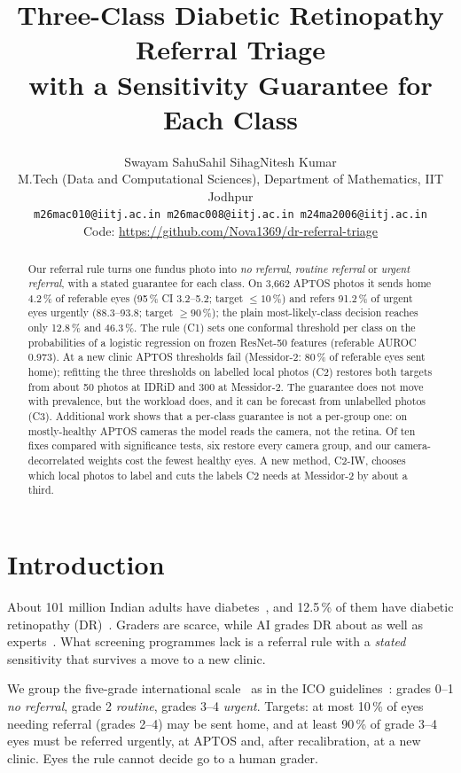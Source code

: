 \documentclass[10pt,twocolumn,letterpaper]{article}
\title{Three-Class Diabetic Retinopathy Referral Triage\\with a Sensitivity Guarantee for Each Class}
\author{Swayam Sahu\qquad Sahil Sihag\qquad Nitesh Kumar\\
M.Tech (Data and Computational Sciences), Department of Mathematics, IIT Jodhpur\\
{\tt\small m26mac010@iitj.ac.in \quad m26mac008@iitj.ac.in \quad m24ma2006@iitj.ac.in}\\
{\small Code: \url{https://github.com/Nova1369/dr-referral-triage}}}
\newcommand{\pct}{\,\%}
\begin{document}
\maketitle

\begin{abstract}
Our referral rule turns one fundus photo into \emph{no referral}, \emph{routine referral} or \emph{urgent referral}, with a stated guarantee for each class. On 3,662 APTOS photos it sends home 4.2\pct{} of referable eyes (95\pct{} CI 3.2--5.2; target ${\le}10$\pct) and refers 91.2\pct{} of urgent eyes urgently (88.3--93.8; target ${\ge}90$\pct); the plain most-likely-class decision reaches only 12.8\pct{} and 46.3\pct. The rule (C1) sets one conformal threshold per class on the probabilities of a logistic regression on frozen ResNet-50 features (referable AUROC 0.973). At a new clinic APTOS thresholds fail (Messidor-2: 80\pct{} of referable eyes sent home); refitting the three thresholds on labelled local photos (C2) restores both targets from about 50 photos at IDRiD and 300 at Messidor-2. The guarantee does not move with prevalence, but the workload does, and it can be forecast from unlabelled photos (C3). Additional work shows that a per-class guarantee is not a per-group one: on mostly-healthy APTOS cameras the model reads the camera, not the retina. Of ten fixes compared with significance tests, six restore every camera group, and our camera-decorrelated weights cost the fewest healthy eyes. A new method, C2-IW, chooses which local photos to label and cuts the labels C2 needs at Messidor-2 by about a third.
\end{abstract}

\section{Introduction}
About 101 million Indian adults have diabetes~\cite{indiab}, and 12.5\pct{} of them have diabetic retinopathy (DR)~\cite{smart}. Graders are scarce, while AI grades DR about as well as experts~\cite{gulshan16,gulshan19}. What screening programmes lack is a referral rule with a \emph{stated} sensitivity that survives a move to a new clinic.

We group the five-grade international scale~\cite{wilkinson} as in the ICO guidelines~\cite{ico}: grades 0--1 \emph{no referral}, grade 2 \emph{routine}, grades 3--4 \emph{urgent}. Targets: at most 10\pct{} of eyes needing referral (grades 2--4) may be sent home, and at least 90\pct{} of grade 3--4 eyes must be referred urgently, at APTOS and, after recalibration, at a new clinic. Eyes the rule cannot decide go to a human grader.
\end{document}
